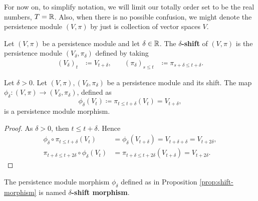 For now on, to simplify notation, we will limit our totally order set to be the real numbers, $ T = \mathbb R $. Also, when there is no possible confusion, we might denote the persistence module $ (V, \pi) $ by just is collection of vector spaces $ V $.

\begin{definition}
    Let $ (V, \pi) $ be a persistence module and let $ \delta \in \mathbb R $. The {\bf $\delta$-shift} of $ (V, \pi) $ is the persistence module $ (V_\delta, \pi_\delta) $ defined by taking
    \begin{align}
        (V_\delta)_t &\coloneq V_{t+\delta}, \quad & (\pi_\delta)_{s\leq t} &\coloneq \pi_{s+\delta \leq t+\delta}.
    \end{align}
\end{definition}

\begin{proposition} \label{prop:shift-morphism}
    Let $ \delta > 0 $. Let $(V, \pi), (V_\delta, \pi_\delta) $ be a persistence module and its shift. The map $ \phi_\delta \colon (V, \pi) \to (V_\delta, \pi_\delta) $, defined as
    \begin{equation}
        \phi_\delta (V_t) \coloneq \pi_{t \leq t + \delta}(V_t) = V_{t+\delta},
    \end{equation}
    is a persistence module morphism.
\end{proposition}
\begin{proof}
    As $ \delta > 0 $, then $ t \leq t+\delta $. Hence
    \begin{align}
        \phi_\delta \circ \pi_{t \leq t+\delta} (V_t) &= \phi_\delta (V_{t+\delta}) = V_{t+\delta+\delta} = V_{t+2 \delta}, \\
        \pi_{t+\delta \leq t+2\delta} \circ \phi_\delta (V_t) &= \pi_{t+\delta \leq t+2\delta}(V_{t+\delta}) = V_{t+2 \delta}.
    \end{align}
\end{proof}

\begin{definition}
    The persistence module morphism $ \phi_\delta $ defined as in Proposition \ref{prop:shift-morphism} is named {\bf $\delta$-shift morphism}.
\end{definition}

